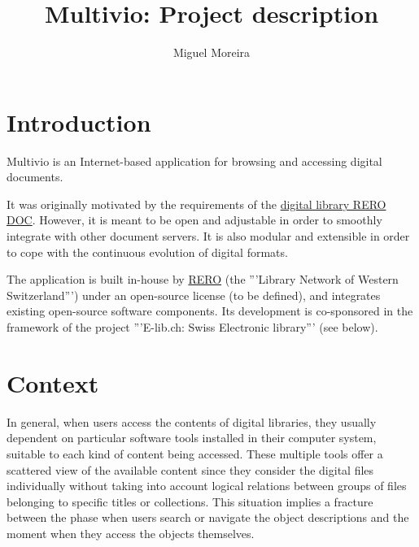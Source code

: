 \documentclass [a4paper]{article}
\title{Multivio: Project description}
\author{Miguel Moreira}
\begin{document}
\maketitle

\section{Introduction}

Multivio is an Internet-based application for browsing and accessing digital
documents.

It was originally motivated by the requirements of the
\href{http://doc.rero.ch/}{digital library RERO DOC}. However, it is meant to
be open and adjustable in order to smoothly integrate with other document
servers. It is also modular and extensible in order to cope with the continuous
evolution of digital formats.

The application is built in-house by \href{http://www.rero.ch/}{RERO} (the
'''Library Network of Western Switzerland''') under an open-source license (to
be defined), and integrates existing open-source software components. Its
development is co-sponsored in the framework of the project '''E-lib.ch: Swiss
Electronic library''' (see below).

\section{Context}

In general, when users access the contents of digital libraries, they usually
dependent on particular software tools installed in their computer system,
suitable to each kind of content being accessed. These multiple tools offer a
scattered view of the available content since they consider the digital files
individually without taking into account logical relations between groups of
files belonging to specific titles or collections. This situation implies a
fracture between the phase when users search or navigate the object
descriptions and the moment when they access the objects themselves.
\end{document}
